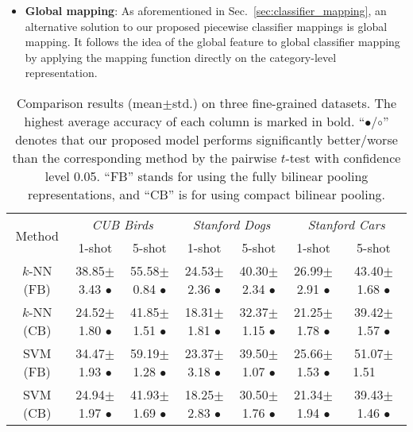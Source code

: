 \documentclass[10pt,twocolumn,letterpaper]{article}
\begin{document}
\begin{itemize}
\item \textbf{Global mapping}: As aforementioned in Sec.~\ref{sec:classifier_mapping}, an alternative solution to our proposed piecewise classifier mappings is global mapping. It follows the idea of the global feature to global classifier mapping by applying the mapping function directly on the category-level representation.
\end{itemize}

\begin{table*}[t]
 \caption{Comparison results (mean$\pm$std.) on three fine-grained datasets. The highest average accuracy of each column is marked in bold. ``$\bullet$/$\circ$'' denotes that our proposed model performs significantly better/worse than the corresponding method by the pairwise $t$-test with confidence level 0.05. ``FB'' stands for using the fully bilinear pooling representations, and ``CB'' is for using compact bilinear pooling.} \label{table:result}
 \centering
 \small
 \begin{tabular}{|c|c|c|c|c|c|c|}
  \hline
  \multirow{2}{*}{Method} & \multicolumn{2}{c|}{\textit{CUB Birds}} & \multicolumn{2}{c|}{\textit{Stanford Dogs}} & \multicolumn{2}{c|}{\textit{Stanford Cars}} \\
  \cline{2-7} & 1-shot & 5-shot & 1-shot & 5-shot & 1-shot & 5-shot  \\
  \hline
  \hline
  $k$-NN (FB) &  38.85{\scriptsize$\pm$3.43} $\bullet$  &  55.58{\scriptsize$\pm$0.84} $\bullet$   &  24.53{\scriptsize$\pm$2.36} $\bullet$   &  40.30{\scriptsize$\pm$2.34} $\bullet$   &  26.99{\scriptsize$\pm$2.91} $\bullet$  &  43.40{\scriptsize$\pm$1.68} $\bullet$   \\
  $k$-NN (CB) &  24.52{\scriptsize$\pm$1.80} $\bullet$ & 41.85{\scriptsize$\pm$1.51} $\bullet$ &  18.31{\scriptsize$\pm$1.81} $\bullet$ & 32.37{\scriptsize$\pm$1.15} $\bullet$   & 21.25{\scriptsize$\pm$1.78} $\bullet$   &   39.42{\scriptsize$\pm$1.57} $\bullet$  \\
  SVM (FB) &  34.47{\scriptsize$\pm$1.93} $\bullet$  &  59.19{\scriptsize$\pm$1.28} $\bullet$  &  23.37{\scriptsize$\pm$3.18} $\bullet$  &  39.50{\scriptsize$\pm$1.07} $\bullet$  & 25.66{\scriptsize$\pm$1.53} $\bullet$   &  51.07{\scriptsize$\pm$1.51}~~~   \\
  SVM (CB) & 24.94{\scriptsize$\pm$1.97} $\bullet$   & 41.93{\scriptsize$\pm$1.69} $\bullet$   &  18.25{\scriptsize$\pm$2.83} $\bullet$  &  30.50{\scriptsize$\pm$1.76} $\bullet$  &  21.34{\scriptsize$\pm$1.94} $\bullet$  &   39.43{\scriptsize$\pm$1.46} $\bullet$  \\

\end{tabular}
\end{table*}
\end{document}
